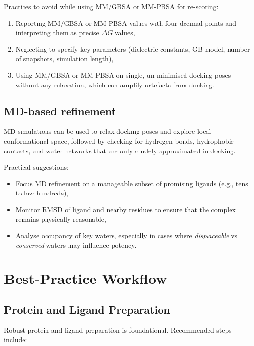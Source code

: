 \documentclass[12pt]{article}
\begin{document}
Practices to avoid while using MM/GBSA or MM-PBSA for re-scoring:

\begin{enumerate}
  \item Reporting MM/GBSA or MM-PBSA values with four decimal points and interpreting them as precise $\Delta G$ values,
  \item Neglecting to specify key parameters (dielectric constants, GB model, number of snapshots, simulation length),
  \item Using MM/GBSA  or MM-PBSA on single, un-minimised docking poses without any relaxation, which can amplify artefacts from docking.
\end{enumerate}

\subsection{MD-based refinement}

MD simulations can be used to relax docking poses and explore local conformational space, followed by checking for hydrogen bonds, hydrophobic contacts, and water networks that are only crudely approximated in docking\cite{CH8_meng2011,CH8_MMGBSApose2011}.

Practical suggestions:

\begin{itemize}
  \item Focus MD refinement on a manageable subset of promising ligands (e.g., tens to low hundreds),
  \item Monitor RMSD of ligand and nearby residues to ensure that the complex remains physically reasonable,
  \item Analyse occupancy of key waters, especially in cases where \emph{displaceable} vs  \emph{conserved} waters may influence potency.
\end{itemize}

\section{Best-Practice Workflow}

\subsection{Protein and Ligand Preparation}

Robust protein and ligand preparation is foundational. Recommended steps include:
\end{document}

